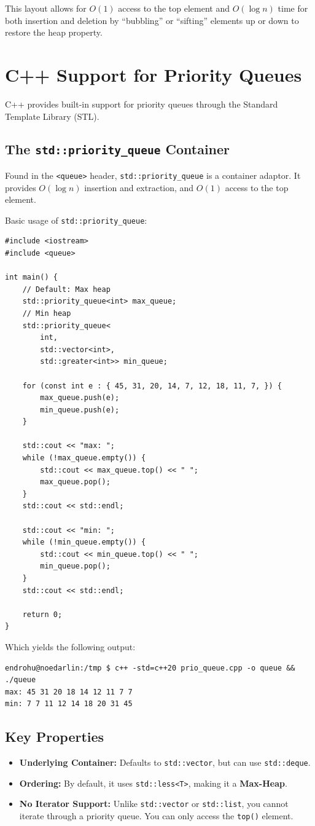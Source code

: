 \documentclass[11pt]{article}
\begin{document}
This layout allows for \(O(1)\) access to the top element and \(O(\log n)\) time for both insertion and deletion by ``bubbling'' or ``sifting'' elements up or down to restore the heap property.

\newpage
\section{C++ Support for Priority Queues}
\label{sec:orgd65e60d}
C++ provides built-in support for priority queues through the Standard Template Library (STL).
\subsection{The \texttt{std::priority\_queue} Container}
\label{sec:orgd699af8}
Found in the \texttt{<queue>} header, \texttt{std::priority\_queue} is a container adaptor. It provides \(O(\log n)\) insertion and extraction, and \(O(1)\) access to the top element.

Basic usage of \texttt{std::priority\_queue}:
\begin{verbatim}
#include <iostream>
#include <queue>

int main() {
    // Default: Max heap
    std::priority_queue<int> max_queue;
    // Min heap
    std::priority_queue<
        int, 
        std::vector<int>, 
        std::greater<int>> min_queue;

    for (const int e : { 45, 31, 20, 14, 7, 12, 18, 11, 7, }) {
        max_queue.push(e);
        min_queue.push(e);
    }

    std::cout << "max: ";
    while (!max_queue.empty()) {
        std::cout << max_queue.top() << " ";
        max_queue.pop();
    }
    std::cout << std::endl;
    
    std::cout << "min: ";
    while (!min_queue.empty()) {
        std::cout << min_queue.top() << " ";
        min_queue.pop();
    }
    std::cout << std::endl;

    return 0;
}
\end{verbatim}

Which yields the following output:
\begin{verbatim}
endrohu@noedarlin:/tmp $ c++ -std=c++20 prio_queue.cpp -o queue && ./queue 
max: 45 31 20 18 14 12 11 7 7 
min: 7 7 11 12 14 18 20 31 45
\end{verbatim}
\subsection{Key Properties}
\label{sec:orgd68e689}
\begin{itemize}
\item \textbf{Underlying Container:} Defaults to \texttt{std::vector}, but can use \texttt{std::deque}.
\item \textbf{Ordering:} By default, it uses \texttt{std::less<T>}, making it a \textbf{Max-Heap}.
\item \textbf{No Iterator Support:} Unlike \texttt{std::vector} or \texttt{std::list}, you cannot iterate through a priority queue. You can only access the \texttt{top()} element.

\newpage
\end{itemize}
\end{document}
